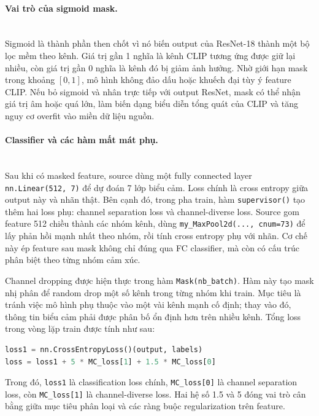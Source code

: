 \paragraph{Vai trò của sigmoid mask.}\mbox{}\\
Sigmoid là thành phần then chốt vì nó biến output của ResNet-18 thành một bộ lọc mềm theo kênh. Giá trị gần 1 nghĩa là kênh CLIP tương ứng được giữ lại nhiều, còn giá trị gần 0 nghĩa là kênh đó bị giảm ảnh hưởng. Nhờ giới hạn mask trong khoảng \([0,1]\), mô hình không đảo dấu hoặc khuếch đại tùy ý feature CLIP. Nếu bỏ sigmoid và nhân trực tiếp với output ResNet, mask có thể nhận giá trị âm hoặc quá lớn, làm biến dạng biểu diễn tổng quát của CLIP và tăng nguy cơ overfit vào miền dữ liệu nguồn.

\paragraph{Classifier và các hàm mất mát phụ.}\mbox{}\\
Sau khi có masked feature, source dùng một fully connected layer \texttt{nn.Linear(512, 7)} để dự đoán 7 lớp biểu cảm. Loss chính là cross entropy giữa output này và nhãn thật. Bên cạnh đó, trong pha train, hàm \texttt{supervisor()} tạo thêm hai loss phụ: channel separation loss và channel-diverse loss. Source gom feature 512 chiều thành các nhóm kênh, dùng \texttt{my\_MaxPool2d(..., cnum=73)} để lấy phản hồi mạnh nhất theo nhóm, rồi tính cross entropy phụ với nhãn. Cơ chế này ép feature sau mask không chỉ đúng qua FC classifier, mà còn có cấu trúc phân biệt theo từng nhóm cảm xúc.

Channel dropping được hiện thực trong hàm \texttt{Mask(nb\_batch)}. Hàm này tạo mask nhị phân để random drop một số kênh trong từng nhóm khi train. Mục tiêu là tránh việc mô hình phụ thuộc vào một vài kênh mạnh cố định; thay vào đó, thông tin biểu cảm phải được phân bố ổn định hơn trên nhiều kênh. Tổng loss trong vòng lặp train được tính như sau:
\begin{lstlisting}[language=Python]
loss1 = nn.CrossEntropyLoss()(output, labels)
loss = loss1 + 5 * MC_loss[1] + 1.5 * MC_loss[0]
\end{lstlisting}
Trong đó, \texttt{loss1} là classification loss chính, \texttt{MC\_loss[0]} là channel separation loss, còn \texttt{MC\_loss[1]} là channel-diverse loss. Hai hệ số 1.5 và 5 đóng vai trò cân bằng giữa mục tiêu phân loại và các ràng buộc regularization trên feature.

